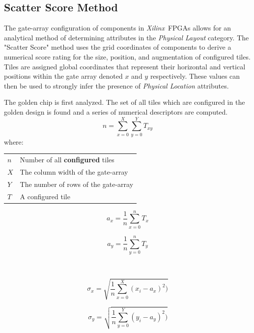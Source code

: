 \documentclass[conference]{IEEEtran}
\makeatletter
\newcommand{\Xilinx}{\textit{\gls{Xilinx}}~}
\newcommand{\ConditionSize}{\footnotesize}
\newenvironment{conditions}
{\par\vspace{\abovedisplayskip}\noindent\begin{tabular}{>{$}l<{$} @{${}={}$} l}}
	{\end{tabular}\par\vspace{\belowdisplayskip}}
\makeatother
\begin{document}
\subsection{Scatter Score Method} \label{sec:scatterScore}
The gate-array configuration of components in \Xilinx \acrshort{FPGA}s allows for an analytical method of determining attributes in the \textit{Physical Layout} category.
The "Scatter Score" method uses the grid coordinates of components to derive a numerical score rating for the size, position, and augmentation of configured tiles.
Tiles are assigned global coordinates that represent their horizontal and vertical positions within the gate array denoted $x$ and $y$ respectively. 
These values can then be used to strongly infer the presence of \textit{Physical Location} attributes.

The golden chip is first analyzed.
The set of all tiles which are configured in the golden design is found and a series of numerical descriptors are computed.
\begin{equation} \label{eqn:numConfiguredTiles}
n = \sum_{x = 0}^{X}\sum_{y = 0}^{Y}T_{xy}
\end{equation}
\ConditionSize
where:
\begin{conditions}
	n     &  Number of all \textbf{configured} tiles \\
	X     &  The column width of the gate-array \\   
	Y     &  The number of rows of the gate-array \\
	T     &  A configured tile
\end{conditions}
\normalsize

\noindent\begin{minipage}{.5\linewidth}
	\begin{equation} \label{eqn:xAverage}
	a_x = \frac{1}{n}\sum_{x=0}^{n}T_x
	\end{equation}
\end{minipage}%
\begin{minipage}{.5\linewidth}
	\begin{equation} \label{eqn:yAverage}
	a_y = \frac{1}{n}\sum_{y=0}^{n}T_y
	\end{equation}
\end{minipage}
\\
\noindent\begin{minipage}{.5\linewidth}
	\begin{equation} \label{eqn:stdDevX}
	\sigma_x = \sqrt{\frac{1}{n}\sum_{x = 0}^{X}(x_i - a_x)^2)}
	\end{equation}
\end{minipage}%
\begin{minipage}{.5\linewidth}
	\begin{equation} \label{eqn:stdDevY}
	\sigma_y = \sqrt{\frac{1}{n}\sum_{y = 0}^{Y}(y_i - a_y)^2)}
	\end{equation}
\end{minipage}
\end{document}
